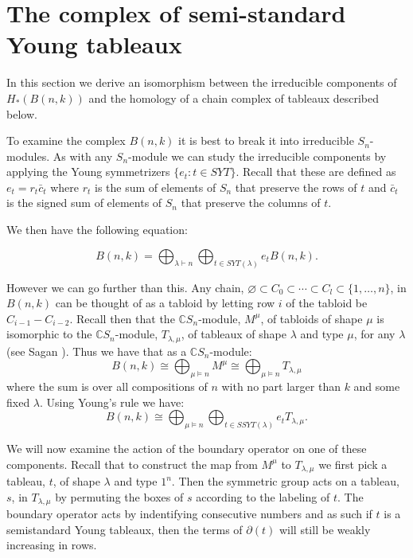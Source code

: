 \documentclass{amsart}
\newcommand{\C}{\mathbb{C}}
\newcommand{\GC}{\varnothing \subset C_0 \subset \cdots \subset C_l \subset \{1, \ldots, n\}}
\begin{document}
\section{The complex of semi-standard Young tableaux}
In this section we derive an isomorphism between the irreducible components of $H_*(B(n, k))$ and the homology of a chain
complex of tableaux described below.

To examine the complex $B(n, k)$ it is best to break it into irreducible $S_n$-modules. As with any $S_n$-module we can 
study the irreducible components by applying the Young symmetrizers $\{e_t \colon t \in SYT \}$. Recall that these are 
defined as $e_t = r_t {\bar c}_t$ where $r_t$ is the sum of elements of $S_n$ that preserve the rows of $t$ and 
${\bar c}_t$ is the signed sum of elements of $S_n$ that preserve the columns of $t$. 

We then have the following equation:

$$B(n, k) = \bigoplus_{\lambda \vdash n} \bigoplus_{t \in SYT(\lambda)} e_t B(n, k).$$

However we can go further than this. Any chain, $\GC$,  in $B(n, k)$ can be thought of as a tabloid by letting row $i$ of 
the tabloid be $C_{i-1} - C_{i-2}$. Recall then that the $\C S_n$-module, $M^\mu$,  of tabloids of shape $\mu$ is isomorphic
to the $\C S_n$-module, $T_{\lambda, \mu}$, of tableaux of shape $\lambda$ and type $\mu$, for any $\lambda$ (see Sagan 
\cite{Sagan}). Thus we have that as a $\C S_n$-module:
$$ B(n, k) \cong \bigoplus_{\mu \models n} M^\mu \cong \bigoplus_{\mu \models n} T_{\lambda, \mu}$$ where the sum is over 
all compositions of $n$ with no part larger than $k$ and some fixed $\lambda$. Using Young's rule we have:
$$ B(n, k) \cong \bigoplus_{\mu \models n} \bigoplus_{t \in SSYT(\lambda)} e_t T_{\lambda, \mu}. $$
 

We will now examine the action of the boundary operator on one of these components. Recall that to construct the
map from $M^\mu$ to $T_{\lambda, \mu}$ we first pick a tableau, $t$,  of shape $\lambda$ and type $1^n$. Then the 
symmetric group acts on a tableau, $s$,  in $T_{\lambda, \mu}$ by permuting the boxes of $s$ according to the labeling of
$t$. The boundary operator acts by indentifying consecutive numbers and as such if $t$ is a semistandard Young tableaux, 
then the terms of $\partial(t)$ will still be weakly increasing in rows. 
\end{document}
